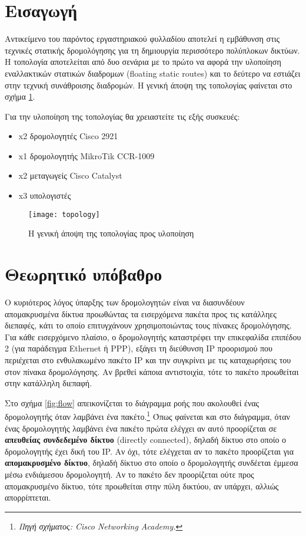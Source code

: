 \documentclass{EdipyLabs} %
\begin{document}
\Initialize

\section*{Εισαγωγή}
Αντικείμενο του παρόντος εργαστηριακού φυλλαδίου αποτελεί η εμβάθυνση στις τεχνικές στατικής δρομολόγησης για τη δημιουργία περισσότερο πολύπλοκων δικτύων. Η τοπολογία αποτελείται από δυο σενάρια με το πρώτο να αφορά την υλοποίηση εναλλακτικών στατικών διαδρομων (floating static routes) και το δεύτερο να εστιάζει στην τεχνική συνάθροισης διαδρομών. Η γενική άποψη της τοπολογίας φαίνεται στο σχήμα \ref{fig:topology}.

Για την υλοποίηση της τοπολογίας θα χρειαστείτε τις εξής συσκευές:
\begin{itemize}
	\item x2 δρομολογητές Cisco 2921
	\item x1 δρομολογητής MikroTik CCR-1009
	\item x2 μεταγωγείς Cisco Catalyst
	\item x3 υπολογιστές
\end{itemize}

\begin{figure}[ht]
	\centering
	\texttt{[image: topology]}
	\caption{H γενική άποψη της τοπολογίας προς υλοποίηση}\label{fig:topology}
\end{figure}

\section{Θεωρητικό υπόβαθρο}
Ο κυριότερος λόγος ύπαρξης των δρομολογητών είναι να διασυνδέουν απομακρυσμένα δίκτυα προωθώντας τα εισερχόμενα πακέτα προς τις κατάλληες διεπαφές, κάτι το οποίο επιτυγχάνουν χρησιμοποιώντας τους πίνακες δρομολόγησης. Για κάθε εισερχόμενο πλαίσιο, ο δρομολογητής καταστρέφει την επικεφαλίδα επιπέδου 2 (για παράδειγμα Ethernet ή PPP), εξάγει τη διεύθυνση IP προορισμού που περιέχεται στο ενθυλακωμένο πακέτο IP και την συγκρίνει με τις καταχωρήσεις του στον πίνακα δρομολόγησης. Αν βρεθεί κάποια αντιστοιχία, τότε το πακέτο προωθείται στην κατάλληλη διεπαφή.

Στο σχήμα \ref{fig:flow} απεικονίζεται το διάγραμμα ροής που ακολουθεί ένας δρομολογητής όταν λαμβάνει ένα πακέτο.\footnote{\itshape Πηγή σχήματος: Cisco Networking Academy.} Όπως φαίνεται και στο διάγραμμα, όταν ένας δρομολογητής λαμβάνει ένα πακέτο πρώτα ελέγχει αν αυτό προορίζεται σε \textbf{απευθείας συνδεδεμένο δίκτυο} (directly connected), δηλαδή δίκτυο στο οποίο ο δρομολογητής έχει δική του IP. Αν όχι, τότε ελέγχεται αν το πακέτο προορίζεται για \textbf{απομακρυσμένο δίκτυο}, δηλαδή δίκτυο στο οποίο ο δρομολογητής συνδέεται έμμεσα μέσω ενδιάμεσου δρομολογητή. Αν το πακέτο δεν προορίζεται ούτε προς απομακρυσμένο δίκτυο, τότε προωθείται στην πύλη δικτύου, αν υπάρχει, αλλιώς απορρίπτεται.
\end{document}
